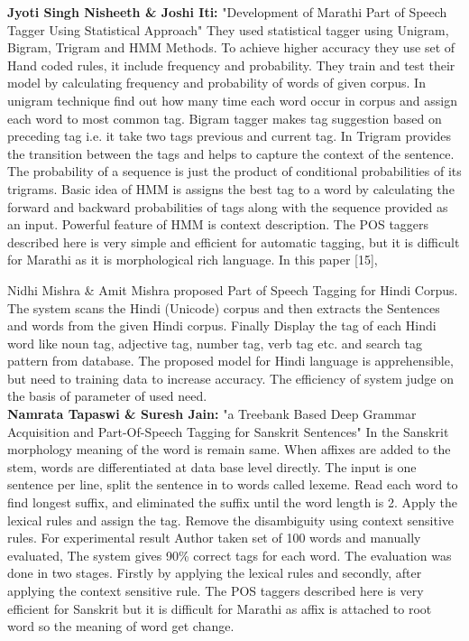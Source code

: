 \documentclass[12pt,a4paper,oneside]{memoir}
\begin{document}
\textbf{Jyoti Singh Nisheeth \& Joshi Iti:} "Development of Marathi Part of Speech Tagger Using Statistical Approach"  They used statistical tagger using Unigram, Bigram, Trigram and HMM Methods. To achieve higher accuracy they use set of Hand coded rules, it include frequency and probability. They train and test their model by calculating frequency and probability of words of given corpus. In unigram technique find out how many time each word occur in corpus and assign each word to most common tag. Bigram tagger makes tag suggestion based on preceding tag i.e. it take two tags previous and current tag. In Trigram provides the transition between the tags and helps to capture the context of the sentence. The probability of a sequence is just the product of conditional probabilities of its trigrams. Basic idea of HMM is assigns the best tag to a word by calculating the forward and backward probabilities of tags along with the sequence provided as an input. Powerful feature of HMM is context description. The POS taggers described here is very simple and efficient for automatic tagging, but it is difficult for Marathi as it is morphological rich language. In this paper [15],

Nidhi Mishra \& Amit Mishra proposed Part of Speech Tagging for Hindi Corpus. The system scans the Hindi (Unicode) corpus and then extracts the Sentences and words from the given Hindi corpus. Finally Display the tag of each Hindi word like noun tag, adjective tag, number tag, verb tag etc. and search tag pattern from database. The proposed model for Hindi language is apprehensible, but need to training data to increase accuracy. The efficiency of system judge on the basis of parameter of used need. \\

\textbf{ Namrata Tapaswi \& Suresh Jain:} "a Treebank Based Deep Grammar Acquisition and Part-Of-Speech Tagging for Sanskrit Sentences" In the Sanskrit morphology meaning of the word is remain same. When affixes are added to the stem, words are differentiated at data base level directly. The input is one sentence per line, split the sentence in to words called lexeme. Read each word to find longest suffix, and eliminated the suffix until the word length is 2. Apply the lexical rules and assign the tag. Remove the disambiguity using context sensitive rules. For experimental result Author taken set of 100 words and manually evaluated, The system gives 90\% correct tags for each word. The evaluation was done in two stages. Firstly by applying the lexical rules and secondly, after applying the context sensitive rule. The POS taggers described here is very efficient for Sanskrit but it is difficult for Marathi as affix is attached to root word so the meaning of word get change.\\
\end{document}
